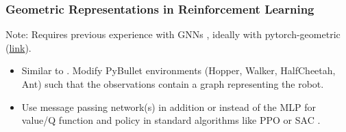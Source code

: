 \documentclass[a4paper]{article}
\begin{document}

\subsubsection{Geometric Representations in Reinforcement Learning}
Note: Requires previous experience with GNNs \citet{kipf2016semisupervised}, ideally with pytorch-geometric (\href{https://github.com/pyg-team/pytorch_geometric}{link}).
\begin{itemize}
  \item Similar to \citet{Wang2018nervenet}. Modify PyBullet environments (Hopper, Walker, HalfCheetah, Ant) such that the observations contain a graph representing the robot.
  \item Use message passing network(s) in addition or instead of the MLP for value/Q function and policy in standard algorithms like PPO \citet{Schulman2017} or SAC \citet{Haarnoja2018a}.
\end{itemize}

\end{document}
